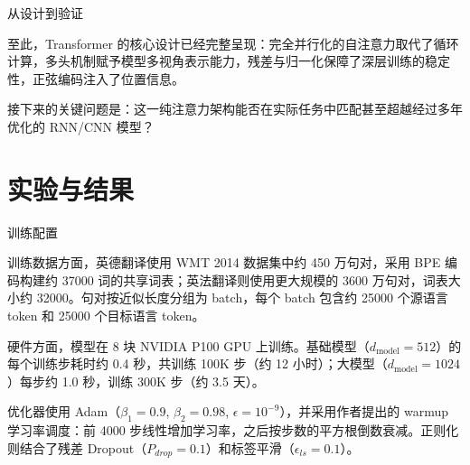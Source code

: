 \documentclass[10pt, aspectratio=169, noamsthm, t]{beamer}
\begin{document}
\begin{frame}{从设计到验证}

至此，Transformer 的核心设计已经完整呈现：完全并行化的自注意力取代了循环计算，多头机制赋予模型多视角表示能力，残差与归一化保障了深层训练的稳定性，正弦编码注入了位置信息。

\vskip0.25cm

接下来的关键问题是：这一纯注意力架构能否在实际任务中匹配甚至超越经过多年优化的 RNN/CNN 模型？

\vskip0.25cm

\end{frame}

\section{实验与结果}

\begin{frame}{训练配置}

训练数据方面，英德翻译使用 WMT 2014 数据集中约 450 万句对，采用 BPE 编码构建约 37000 词的共享词表；英法翻译则使用更大规模的 3600 万句对，词表大小约 32000。句对按近似长度分组为 batch，每个 batch 包含约 25000 个源语言 token 和 25000 个目标语言 token。

\vskip0.2cm

硬件方面，模型在 8 块 NVIDIA P100 GPU 上训练。基础模型（$d_{\text{model}}{=}512$）的每个训练步耗时约 0.4 秒，共训练 100K 步（约 12 小时）；大模型（$d_{\text{model}}{=}1024$）每步约 1.0 秒，训练 300K 步（约 3.5 天）。

\vskip0.2cm

优化器使用 Adam（$\beta_1{=}0.9$, $\beta_2{=}0.98$, $\epsilon{=}10^{-9}$），并采用作者提出的 warmup 学习率调度：前 4000 步线性增加学习率，之后按步数的平方根倒数\alert{衰减}。正则化则结合了残差 Dropout（$P_{drop}{=}0.1$）和标签平滑（$\epsilon_{ls}{=}0.1$）。
\end{frame}
\end{document}
